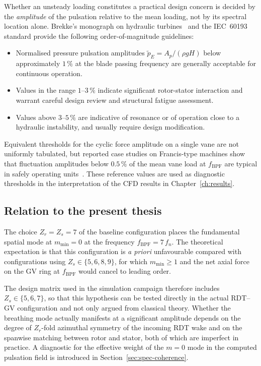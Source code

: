 Whether an unsteady loading constitutes a practical design concern
is decided by the \emph{amplitude} of the pulsation relative to the
mean loading, not by its spectral location alone. Brekke's monograph
on hydraulic turbines~\cite{Brekke2015,Brekke2010} and the IEC~60193
standard provide the following order-of-magnitude guidelines:
\begin{itemize}
  \item Normalised pressure pulsation amplitudes
        $\tilde{p}_{E} = A_p / (\rho g H)$ below approximately
        $1\,\%$ at the blade passing frequency are generally
        acceptable for continuous operation.
  \item Values in the range $1$--$3\,\%$ indicate significant
        rotor-stator interaction and warrant careful design review
        and structural fatigue assessment.
  \item Values above $3$--$5\,\%$ are indicative of resonance or of
        operation close to a hydraulic instability, and usually
        require design modification.
\end{itemize}
Equivalent thresholds for the cyclic force amplitude on a single
vane are not uniformly tabulated, but reported case studies on
Francis-type machines show that fluctuation amplitudes below
$0.5\,\%$ of the mean vane load at $f_{\mathrm{BPF}}$ are typical in
safely operating units~\cite{Egusquiza2006}. These reference values
are used as diagnostic thresholds in the interpretation of the
CFD results in Chapter~\ref{ch:results}.
 
\subsection{Relation to the present thesis}
\label{sec:rsi-thesis}
 
The choice $Z_r = Z_s = 7$ of the baseline configuration places the
fundamental spatial mode at $m_{\min} = 0$ at the frequency
$f_{\mathrm{BPF}} = 7\,f_n$. The theoretical expectation is that
this configuration is \emph{a priori} unfavourable compared with
configurations using $Z_s \in \{5,6,8,9\}$, for which
$m_{\min} \geq 1$ and the net axial force on the GV ring at
$f_{\mathrm{BPF}}$ would cancel to leading order.
 
The design matrix used in the simulation campaign therefore includes
$Z_s \in \{5,6,7\}$, so that this hypothesis can be tested directly
in the actual RDT--GV configuration and not only argued
from classical theory. Whether the breathing mode actually
manifests at a significant amplitude depends on the degree of
$Z_r$-fold azimuthal symmetry of the incoming RDT wake and on
the spanwise matching between rotor and stator, both of which are
imperfect in practice. A diagnostic for the effective weight of the
$m=0$ mode in the computed pulsation field is introduced in
Section~\ref{sec:spec-coherence}.


